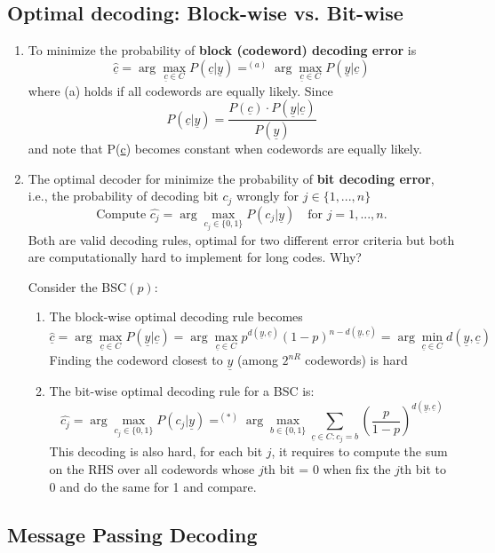 \documentclass[12pt]{article}
\begin{document}
\subsection{Optimal decoding: Block-wise vs. Bit-wise}
\begin{enumerate}[label={\arabic*)}]
    \item To minimize the probability of \textbf{block (codeword) decoding error} is 
    \[
    \hat{\underline{c}} = \arg \max_{\underline{c}\in C}P(\underline{c}|\underline{y}) =^{(a)} \arg \max_{\underline{c}\in C}P(\underline{y}|\underline{c})
    \]
    where (a) holds if all codewords are equally likely. Since
    \[
    P(\underline{c}|\underline{y}) = \frac{P(\underline{c})\cdot P(\underline{y}|\underline{c})}{P(\underline{y})}
    \]
    and note that P(\underline{c}) becomes constant when codewords are equally likely.
    \item The optimal decoder for minimize the probability of \textbf{bit decoding error}, i.e., the probability of decoding bit $c_j$ wrongly for $j\in\{1,...,n\}$
    \[
    \textrm{Compute } \hat{c_j} = \arg \max_{c_j\in \{0,1\}}P(c_j|\underline{y}) \quad \textrm{for } j=1,...,n.
    \]
    Both are valid decoding rules, optimal for two different error criteria but both are computationally hard to implement for long codes. Why?
    
    Consider the BSC$(p)$:
    \begin{enumerate}[label={\arabic*)}]
    \item The block-wise optimal decoding rule becomes 
    \[
    \hat{\underline{c}} = \arg \max_{\underline{c}\in C}P(\underline{y}|\underline{c}) = \arg \max_{\underline{c}\in C}p^{d(\underline{y},\underline{c})}(1-p)^{n-d(\underline{y},\underline{c})} = \arg\min_{\underline{c}\in C}d(\underline{y},\underline{c})
    \]
    Finding the codeword closest to $\underline{y}$ (among $2^{nR}$ codewords) is hard
    \item The bit-wise optimal decoding rule for a BSC is:
    \[
    \hat{c_j} = \arg \max_{c_j\in \{0,1\}}P(c_j|\underline{y}) =^{(*)} \arg \max_{b\in \{0,1\}}\sum_{\underline{c}\in C: c_j=b}\left(\frac{p}{1-p}\right)^{d(\underline{y},\underline{c})}
    \]
    This decoding is also hard, for each bit $j$, it requires to compute the sum on the RHS over all codewords whose $j$th bit = 0 when fix the $j$th bit to 0 and do the same for 1 and compare.
    \end{enumerate}
\end{enumerate}

\subsection{Message Passing Decoding}
\end{document}
